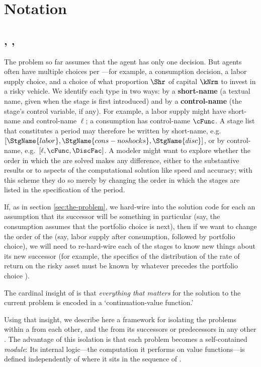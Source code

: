 
\hypertarget{notation}{}
\section{Notation}\label{sec:notation}

\hypertarget{intervals-stages-perches}{}
\subsection{\Intervals, \Stgs, \Prchs}

The problem so far assumes that the agent has only one decision.  But agents often have multiple choices per {\interval}---for example, a consumption decision, a labor supply choice, and a choice of what proportion $\Shr$ of capital $\kNrm$ to invest in a risky vehicle.  We identify each {\stg} type in two ways: by a \textbf{short-name} (a textual name, given when the stage is first introduced) and by a \textbf{control-name} (the stage's control variable, if any).  For example, a labor supply {\stg} might have short-name  and control-name $\ell$; a consumption {\stg} has control-name $\cFunc$.  A stage list that constitutes a period may therefore be written by short-name, e.g.\ $[\StgName{labor}, \StgName{cons-noshocks}, \StgName{disc}]$, or by control-name, e.g.\ $[\ell, \cFunc, \DiscFac]$. A modeler might want to explore whether the order in which the {\stgs} are solved makes any difference, either to the substantive results or to aspects of the computational solution like speed and accuracy; with this scheme they do so merely by changing the order in which the stages are listed in the specification of the period.

If, as in section \ref{sec:the-problem}, we hard-wire into the solution code for each {\stg} an assumption that its successor {\stg} will be something in particular (say, the consumption {\stg} assumes that the portfolio choice is next), then if we want to change the order of the {\stgs} (say, labor supply after consumption, followed by portfolio choice), we will need to re-hard-wire each of the stages to know new things about its new successor (for example, the specifics of the distribution of the rate of return on the risky asset must be known by whatever {\stg} precedes the portfolio choice {\stg}).

The cardinal insight of \citet{bellman1957} is that \emph{everything that matters} for the solution to the current problem is encoded in a `continuation-value function.'

Using that insight, we describe here a framework for isolating the {\stg} problems within a {\interval} from each other, and the {\interval} from its successors or predecessors in any other {\interval}.  The advantage of this isolation is that each {\stg} problem becomes a self-contained \textit{module}: Its internal logic---the computation it performs on value functions---is defined independently of where it sits in the sequence of {\stgs}.

